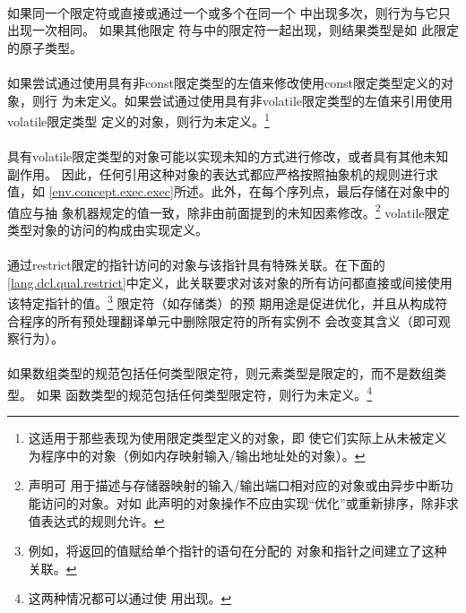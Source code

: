 \paragraph{}
如果同一个限定符或直接或通过一个或多个在同一个
中出现多次，则行为与它只出现一次相同。 如果其他限定
符与中的限定符一起出现，则结果类型是如
此限定的原子类型。

\paragraph{}
如果尝试通过使用具有非const限定类型的左值来修改使用const限定类型定义的对象，则行
为未定义。如果尝试通过使用具有非volatile限定类型的左值来引用使用volatile限定类型
定义的对象，则行为未定义。\footnote{这适用于那些表现为使用限定类型定义的对象，即
使它们实际上从未被定义为程序中的对象（例如内存映射输入/输出地址处的对象）。}

\paragraph{}
具有volatile限定类型的对象可能以实现未知的方式进行修改，或者具有其他未知副作用。
因此，任何引用这种对象的表达式都应严格按照抽象机的规则进行求值，如
\ref{env.concept.exec.exec}所述。此外，在每个序列点，最后存储在对象中的值应与抽
象机器规定的值一致，除非由前面提到的未知因素修改。\footnote{声明可
用于描述与存储器映射的输入/输出端口相对应的对象或由异步中断功能访问的对象。对如
此声明的对象操作不应由实现``优化''或重新排序，除非求值表达式的规则允许。}
volatile限定类型对象的访问的构成由实现定义。

\paragraph{}
通过restrict限定的指针访问的对象与该指针具有特殊关联。在下面的
\ref{lang.dcl.qual.restrict}中定义，此关联要求对该对象的所有访问都直接或间接使用
该特定指针的值。\footnote{例如，将返回的值赋给单个指针的语句在分配的
对象和指针之间建立了这种关联。} 限定符（如存储类）的预
期用途是促进优化，并且从构成符合程序的所有预处理翻译单元中删除限定符的所有实例不
会改变其含义（即可观察行为）。

\paragraph{}
如果数组类型的规范包括任何类型限定符，则元素类型是限定的，而不是数组类型。 如果
函数类型的规范包括任何类型限定符，则行为未定义。\footnote{这两种情况都可以通过使
用出现。}

